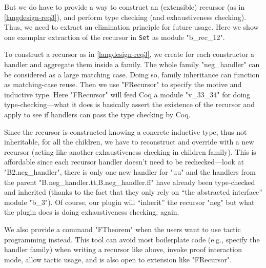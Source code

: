 But we do have to provide a way to construct an (extensible) recursor
(as in \ref{langdesign-req3}), and perform type checking (and
exhaustiveness checking). Thus, we need to extract an elimination
principle for future usage. Here we show one exemplar extraction of the
recursor in \texttt{Set} as module "b_rec_12".

To construct a recursor as in \ref{langdesign-req3}, we create for each
constructor a handler and aggregate them inside a family. The whole
family "neg_handler" can be considered as a large matching case. Doing
so, family inheritance can function as matching-case reuse. Then we use
"FRecursor" to specify the motive and inductive type. Here "FRecursor"
will feed Coq
a module "v_33_34" for doing type-checking---what it does is basically
assert the existence of the recursor and apply to see if handlers can
pass the type checking by Coq. 

Since the recursor is constructed knowing a concrete inductive type,
thus not inheritable, for all the children, we have to reconstruct and
override with a new recursor (acting like another exhaustiveness
checking in children family). This is affordable since each recursor handler doesn't need
to be rechecked---look at "B2.neg_handler", there is only one new
handler for "uu" and the handlers from the parent
"B.neg_handler.tt,B.neg_handler.ff" have already been type-checked and
inherited (thanks to the fact that they only rely on ``the abstracted
interface'' module "b_3"). Of course, our plugin will ``inherit'' the
recursor "neg" but what the plugin does is doing exhaustiveness
checking, again.



We also provide a command "FTheorem" when the users want to use tactic
programming instead. This tool can avoid most boilerplate code (e.g.,
specify the handler family) when writing a recursor like above, invoke
proof interaction mode, allow tactic usage, and is also open to
extension like "FRecursor".

